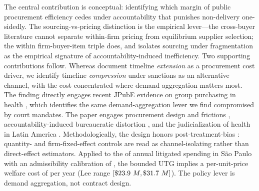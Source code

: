 The central contribution is conceptual: identifying which margin
of public procurement efficiency cedes under accountability that
punishes non-delivery one-sidedly. The sourcing-vs-pricing
distinction is the empirical lever---the cross-buyer literature
cannot separate within-firm pricing from equilibrium supplier
selection; the within firm-buyer-item triple does, and isolates
sourcing under fragmentation as the empirical signature of
accountability-induced inefficiency. Two supporting contributions
follow. Whereas \citet{coviello2018court}
document timeline \emph{extension} as a procurement cost driver, we
identify timeline \emph{compression} under sanctions as an alternative
channel, with the cost concentrated where demand aggregation matters
most. The finding directly engages recent JPubE evidence on group
purchasing in health \citep{lin2025value}, which identifies the same
demand-aggregation lever we find compromised by court mandates. The
paper engages procurement design and frictions \citep{bandiera2009active,
best2023procurement, bosio2022public, decarolis2018buyer,
carril2026competition}, accountability-induced bureaucratic distortion
\citep{prendergast2007bureaucrats, bandiera2021allocation}, and the
judicialization of health in Latin America \citep{wang2015right,
ferraz2009right, biehl2009will}. Methodologically, the design honors
post-treatment-bias \citep{acharya2016explaining}: quantity- and
firm-fixed-effect controls are read as channel-isolating rather than
direct-effect estimators. Applied to the \BPwelfareBoundAnnualSpend{}
of annual litigated spending in S\~ao Paulo with an admissibility
calibration of \BPwelfareBoundAdmissibility, the bounded UTG implies a
per-unit-price welfare cost of \BPwelfareBound{} per year (Lee range
$[\$23.9~M, \$31.7~M]$). The policy lever is
demand aggregation, not contract design.
